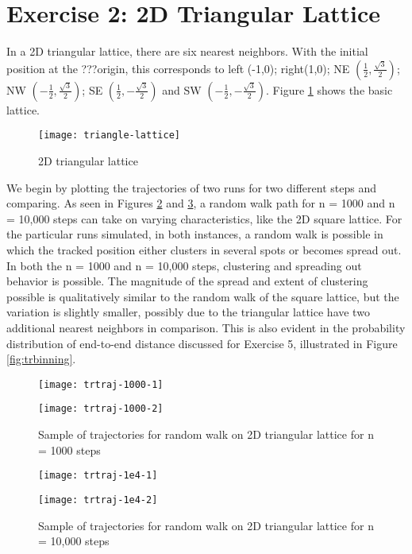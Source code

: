 \documentclass[12pt, oneside]{article}
\begin{document}
\section{Exercise 2: 2D Triangular Lattice}
In a 2D triangular lattice, there are six nearest neighbors. With the initial position at the ???origin, this corresponds to left (-1,0); right(1,0); NE $(\frac{1}{2}, \frac{\sqrt{3}}{2})$; NW $(-\frac{1}{2}, \frac{\sqrt{3}}{2})$; SE $(\frac{1}{2}, -\frac{\sqrt{3}}{2})$ and SW $(-\frac{1}{2}, -\frac{\sqrt{3}}{2})$. Figure \ref{fig:trlattice} shows the basic lattice.

\begin{figure}[htbp]
   \centering
   \texttt{[image: triangle-lattice]} %
   \caption{2D triangular lattice}
   \label{fig:trlattice}
\end{figure}

We begin by plotting the trajectories of two runs for two different steps and comparing. As seen in Figures \ref{fig:trtraj1000} and \ref{fig:trtraj1e4}, a random walk path for n = 1000 and n = 10,000 steps can take on varying characteristics, like the 2D square lattice. For the particular runs simulated, in both instances, a random walk is possible in which the tracked position either clusters in several spots or becomes spread out. In both the n = 1000 and n = 10,000 steps, clustering and spreading out behavior is possible. The magnitude of the spread and extent of clustering possible is qualitatively similar to the random walk of the square lattice, but the variation is slightly smaller, possibly due to the triangular lattice have two additional nearest neighbors in comparison. This is also evident in the probability distribution of end-to-end distance discussed for Exercise 5, illustrated in Figure \ref{fig:trbinning}.

\begin{figure}
\begin{minipage}[htbp]{.49\linewidth}
\centering
\texttt{[image: trtraj-1000-1]}
\end{minipage}
\begin{minipage}[htbp]{.49\linewidth}
\centering
\texttt{[image: trtraj-1000-2]}
\end{minipage}
\caption{Sample of trajectories for random walk on 2D triangular lattice for n = 1000 steps}
\label{fig:trtraj1000}
\end{figure}

\begin{figure}
\begin{minipage}[htbp]{.49\linewidth}
\centering
\texttt{[image: trtraj-1e4-1]}
\end{minipage}
\begin{minipage}[htbp]{.49\linewidth}
\centering
\texttt{[image: trtraj-1e4-2]}
\end{minipage}
\caption{Sample of trajectories for random walk on 2D triangular lattice for n = 10,000 steps}
\label{fig:trtraj1e4}
\end{figure}
\end{document}
